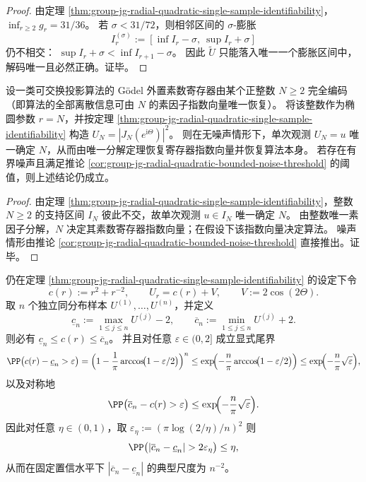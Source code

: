 \begin{proof}
由定理 \ref{thm:group-jg-radial-quadratic-single-sample-identifiability}，\(\inf_{r\ge 2}g_r=31/36\)。
若 \(\sigma<31/72\)，则相邻区间的 \(\sigma\)-膨胀
\[
I_r^{(\sigma)}:=[\inf I_r-\sigma,\ \sup I_r+\sigma]
\]
仍不相交：
\(
\sup I_r+\sigma<\inf I_{r+1}-\sigma
\)。
因此 \(\widetilde U\) 只能落入唯一一个膨胀区间中，解码唯一且必然正确。证毕。
\end{proof}

\begin{proposition}[离散寄存器的径向二次单样本全恢复]\label{prop:group-jg-radial-quadratic-prime-register-recovery}
设一类可交换投影算法的 Gödel 外置素数寄存器由某个正整数 \(N\ge 2\) 完全编码（即算法的全部离散信息可由 \(N\) 的素因子指数向量唯一恢复）。
将该整数作为椭圆参数 \(r=N\)，并按定理 \ref{thm:group-jg-radial-quadratic-single-sample-identifiability} 构造 \(U_N=|J_N(e^{\mathrm{i}\Theta})|^2\)。
则在无噪声情形下，单次观测 \(U_N=u\) 唯一确定 \(N\)，从而由唯一分解定理恢复寄存器指数向量并恢复算法本身。
若存在有界噪声且满足推论 \ref{cor:group-jg-radial-quadratic-bounded-noise-threshold} 的阈值，则上述结论仍成立。
\end{proposition}

\begin{proof}
由定理 \ref{thm:group-jg-radial-quadratic-single-sample-identifiability}，整数 \(N\ge 2\) 的支持区间 \(I_N\) 彼此不交，故单次观测 \(u\in I_N\) 唯一确定 \(N\)。
由整数唯一素因子分解，\(N\) 决定其素数寄存器指数向量；在假设下该指数向量决定算法。
噪声情形由推论 \ref{cor:group-jg-radial-quadratic-bounded-noise-threshold} 直接推出。证毕。
\end{proof}

\begin{theorem}\label{thm:group-jg-radial-quadratic-extreme-concentration}
仍在定理 \ref{thm:group-jg-radial-quadratic-single-sample-identifiability} 的设定下令
\[
c(r):=r^2+r^{-2},
\qquad U_r=c(r)+V,\qquad V:=2\cos(2\Theta).
\]
取 \(n\) 个独立同分布样本 \(U^{(1)},\dots,U^{(n)}\)，并定义
\[
\underline c_n:=\max_{1\le j\le n}U^{(j)}-2,\qquad
\overline c_n:=\min_{1\le j\le n}U^{(j)}+2.
\]
则必有 \(\underline c_n\le c(r)\le \overline c_n\)。
并且对任意 \(\varepsilon\in(0,2]\) 成立显式尾界
\[
\PP\bigl(c(r)-\underline c_n>\varepsilon\bigr)
=\Bigl(1-\frac{1}{\pi}\arccos\!\bigl(1-\varepsilon/2\bigr)\Bigr)^{n}
\le \exp\!\Bigl(-\frac{n}{\pi}\arccos\!\bigl(1-\varepsilon/2\bigr)\Bigr)
\le \exp\!\Bigl(-\frac{n}{\pi}\sqrt{\varepsilon}\Bigr),
\]
以及对称地
\[
\PP\bigl(\overline c_n-c(r)>\varepsilon\bigr)\le \exp\!\Bigl(-\frac{n}{\pi}\sqrt{\varepsilon}\Bigr).
\]
因此对任意 \(\eta\in(0,1)\)，取
\(
\varepsilon_\eta:=(\pi \log(2/\eta)/n)^2
\)
则
\[
\PP\bigl(|\overline c_n-\underline c_n|>2\varepsilon_\eta\bigr)\le \eta,
\]
从而在固定置信水平下 \(|\overline c_n-\underline c_n|\) 的典型尺度为 \(n^{-2}\)。
\end{theorem}

